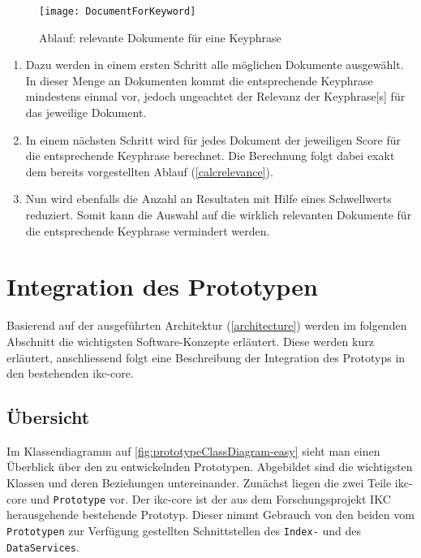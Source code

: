    \begin{figure}[H]
    \centering
    \texttt{[image: DocumentForKeyword]}
    \caption{Ablauf: relevante Dokumente für eine \gls{Keyphrase}}
    \label{fig:seqdocforkeyword}
    \end{figure}
\begin{enumerate}
    \item Dazu werden in einem ersten Schritt alle möglichen Dokumente ausgewählt. In dieser Menge an Dokumenten kommt die entsprechende \gls{Keyphrase} mindestens einmal vor, jedoch ungeachtet der Relevanz der \gls{Keyphrase}[s] für das jeweilige Dokument.
    \item In einem nächsten Schritt wird für jedes Dokument der jeweiligen \gls{Score} für die entsprechende \gls{Keyphrase} berechnet. Die Berechnung folgt dabei exakt dem bereits vorgestellten Ablauf (\autoref{calcrelevance}).

    \item Nun wird ebenfalls die Anzahl an Resultaten mit Hilfe eines Schwellwerts reduziert. Somit kann die Auswahl auf die wirklich relevanten Dokumente für die entsprechende \gls{Keyphrase} vermindert werden.
            
\end{enumerate}


\section{Integration des Prototypen}\label{Integration}


Basierend auf der ausgeführten Architektur (\autoref{architecture}) werden im folgenden Abschnitt die wichtigsten Software-Konzepte erläutert. Diese werden kurz erläutert, anschliessend folgt eine Beschreibung der Integration des Prototyps in den bestehenden \gls{ikc-core}.


\subsection{Übersicht}



Im Klassendiagramm auf \autoref{fig:prototypeClassDiagram-easy} sieht man einen Überblick über den zu entwickelnden Prototypen. Abgebildet sind die wichtigsten Klassen und deren Beziehungen untereinander. Zunächst liegen die zwei Teile \gls{ikc-core} und \texttt{Prototype} vor. Der \gls{ikc-core} ist der aus dem Forschungsprojekt \gls{IKC} herausgehende bestehende Prototyp. Dieser nimmt Gebrauch von den beiden vom \texttt{Prototypen} zur Verfügung gestellten Schnittstellen des \texttt{Index-} und des \texttt{DataServices}.

